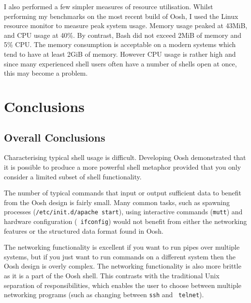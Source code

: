 \documentclass[12pt,twoside,notitlepage]{report}
\begin{document}
I also performed a few simpler measures of resource
utilisation. Whilst performing my benchmarks on the most recent build
of Oosh, I used the Linux resource monitor to measure peak system
usage. Memory usage peaked at 43MiB, and CPU usage at 40\%. By
contrast, Bash did not exceed 2MiB of memory and 5\% CPU. The memory
consumption is acceptable on a modern systems which tend to have at
least 2GiB of memory. However CPU usage is rather high and since many
experienced shell users often have a number of shells open at once,
this may become a problem.


\cleardoublepage
\chapter{Conclusions}


\section{Overall Conclusions}
Characterising typical shell usage is difficult. Developing Oosh
demonstrated that it is possible to produce a more powerful shell
metaphor provided that you only consider a limited subset of shell
functionality. 

The number of typical commands that input or output sufficient data to
benefit from the Oosh design is fairly small. Many common tasks, such
as spawning processes ({\tt /etc/init.d/apache start}), using
interactive commands ({\tt mutt}) and hardware configuration ({\tt
  ifconfig}) would not benefit from either the networking features or
the structured data format found in Oosh.

The networking functionality is excellent if you want to run pipes
over multiple systems, but if you just want to run commands on a
different system then the Oosh design is overly complex. The
networking functionality is also more brittle as it is a part of the
Oosh shell. This contrasts with the traditional Unix separation of
responsibilities, which enables the user to choose between multiple
networking programs (such as changing between {\tt ssh} and {\tt
  telnet}).
\end{document}
